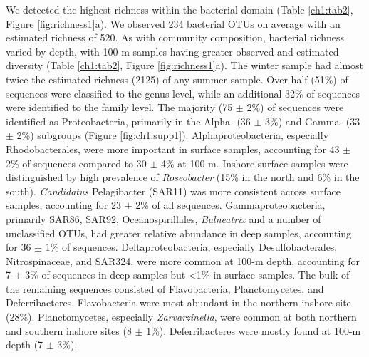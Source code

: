 We detected the highest richness within the bacterial domain (Table \ref{ch1:tab2}, Figure \ref{fig:richness1}a). We observed 234 bacterial OTUs on average with an estimated richness of 520. As with community composition, bacterial richness varied by depth, with 100-m samples having greater observed and estimated diversity (Table \ref{ch1:tab2}, Figure \ref{fig:richness1}a). The winter sample had almost twice the estimated richness (2125) of any summer sample. Over half (51\%) of sequences were classified to the genus level, while an additional 32\% of sequences were identified to the family level. The majority (75 $\pm$ 2\%) of sequences were identified as Proteobacteria, primarily in the Alpha- (36 $\pm$ 3\%) and Gamma- (33 $\pm$ 2\%) subgroups (Figure \ref{fig:ch1:supp1}). Alphaproteobacteria, especially Rhodobacterales, were more important in surface samples, accounting for 43 $\pm$ 2\% of sequences compared to 30 $\pm$ 4\% at 100-m. Inshore surface samples were distinguished by high prevalence of \textit{Roseobacter} (15\% in the north and 6\% in the south). \textit{Candidatus} Pelagibacter (SAR11) was more consistent across surface samples, accounting for 23 $\pm$ 2\% of all sequences. Gammaproteobacteria, primarily SAR86, SAR92, Oceanospirillales, \textit{Balneatrix} and a number of unclassified OTUs, had greater relative abundance in deep samples, accounting for 36 $\pm$ 1\% of sequences. Deltaproteobacteria, especially Desulfobacterales, Nitrospinaceae, and SAR324, were more common at 100-m depth, accounting for 7 $\pm$ 3\% of sequences in deep samples but \textless{}1\% in surface samples. The bulk of the remaining sequences consisted of Flavobacteria, Planctomycetes, and Deferribacteres. Flavobacteria were most abundant in the northern inshore site (28\%). Planctomycetes, especially \textit{Zarvarzinella}, were common at both northern and southern inshore sites (8 $\pm$ 1\%). Deferribacteres were mostly found at 100-m depth (7 $\pm$ 3\%).

